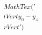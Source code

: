 \documentclass[preview]{standalone}
\begin{document}
\begin{align*}
MathTex('\\lVert y_0 - y_4 \\rVert')
\end{align*}
\end{document}
